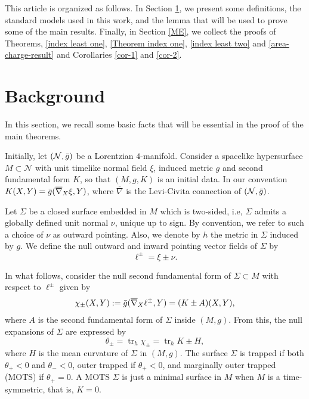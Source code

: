\documentclass[a4paper, 11pt, reqno]{amsart}
\newcommand{\si}{\Sigma}
\newcommand{\tr}{\operatorname{tr}}
\begin{document}
This article is organized as follows. In Section \ref{Back}, we present some definitions, the standard models used in this work, and the lemma that will be used to prove some of the main results. Finally, in Section \ref{ME}, we collect the proofs of Theorems, \ref{index least one}, \ref{Theorem index one}, \ref{index least two} and \ref{area-charge-result} and Corollaries \ref{cor-1} and \ref{cor-2}. 

\section{Background}\label{Back}


In this section, we recall some basic facts that will be essential in the proof of the main theorems. 




Initially,
let $(\mathcal{N},\Bar{g})$ be a Lorentzian $4$-manifold. Consider a spacelike hypersurface $M \subset \mathcal{N}$ with unit timelike normal field $\xi$, induced metric $g$ and second fundamental form $K$, so that $(M,g,K)$ is an initial data. In our convention $K(X,Y) = \Bar{g}(\overline{\nabla}_{X}\xi,Y)$, where $\overline{\nabla}$ is the Levi-Civita connection of $(\mathcal{N},\Bar{g})$.
 
 Let $\Sigma$ be a closed surface embedded in $M$ which is two-sided, i.e, $\si$ admits a globally defined unit normal $\nu$, unique up to sign. By convention, we refer to such a choice of $\nu$ as outward pointing. Also, we denote by $h$ the metric in $\si$ induced by $g$. We define the null outward and inward pointing vector fields of $\si$ by
 $$\ell^{\pm}=\xi\pm\nu.$$

 In what follows, consider the null second fundamental form of $\Sigma\subset M$ with respect to $\ell^{\pm}$ given by
 \begin{eqnarray*}
     \chi_{\pm}(X,Y):= \Bar{g}(\overline{\nabla}_X \ell^{\pm},Y) =(K \pm A)(X,Y),
 \end{eqnarray*}
 where $A$ is the second fundamental form of $\Sigma$ inside $(M,g)$. From this, the null expansions of $\Sigma$ are expressed by
 \begin{equation*}
     \theta_{\pm}=\tr_h\chi_{\pm} =\tr_h K\pm H,
 \end{equation*}
 where $H$ is the mean curvature of $\Sigma$ in $(M,g)$. The surface $\Sigma$ is trapped if both $\theta_{+}<0$ and $\theta_{-}<0$, outer trapped if $\theta_{+}<0$, and marginally outer trapped (MOTS) if $\theta_{+}=0$. A MOTS $\Sigma$ is just a minimal surface in $M$ when $M$ is a time-symmetric, that is, $K=0$.
\end{document}
